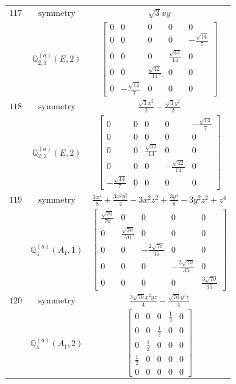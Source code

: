 \documentclass[fleqn,8pt,landscape]{jsarticle}
\begin{document}
\begin{longtable}{ccc}
$ 117 $ & $ \text{symmetry} $ & $ \sqrt{3} x y $ \\
$  $ & $ \mathbb{Q}_{2,1}^{(a)}(E,2) $ & $ \begin{bmatrix} 0 & 0 & 0 & 0 & 0 \\ 0 & 0 & 0 & 0 & - \frac{\sqrt{14}}{7} \\ 0 & 0 & 0 & \frac{\sqrt{42}}{14} & 0 \\ 0 & 0 & \frac{\sqrt{42}}{14} & 0 & 0 \\ 0 & - \frac{\sqrt{14}}{7} & 0 & 0 & 0 \end{bmatrix} $ \\ \hline
$ 118 $ & $ \text{symmetry} $ & $ \frac{\sqrt{3} x^{2}}{2} - \frac{\sqrt{3} y^{2}}{2} $ \\
$  $ & $ \mathbb{Q}_{2,2}^{(a)}(E,2) $ & $ \begin{bmatrix} 0 & 0 & 0 & 0 & - \frac{\sqrt{14}}{7} \\ 0 & 0 & 0 & 0 & 0 \\ 0 & 0 & \frac{\sqrt{42}}{14} & 0 & 0 \\ 0 & 0 & 0 & - \frac{\sqrt{42}}{14} & 0 \\ - \frac{\sqrt{14}}{7} & 0 & 0 & 0 & 0 \end{bmatrix} $ \\ \hline
$ 119 $ & $ \text{symmetry} $ & $ \frac{3 x^{4}}{8} + \frac{3 x^{2} y^{2}}{4} - 3 x^{2} z^{2} + \frac{3 y^{4}}{8} - 3 y^{2} z^{2} + z^{4} $ \\
$  $ & $ \mathbb{Q}_{4}^{(a)}(A_{1},1) $ & $ \begin{bmatrix} \frac{\sqrt{70}}{70} & 0 & 0 & 0 & 0 \\ 0 & \frac{\sqrt{70}}{70} & 0 & 0 & 0 \\ 0 & 0 & - \frac{2 \sqrt{70}}{35} & 0 & 0 \\ 0 & 0 & 0 & - \frac{2 \sqrt{70}}{35} & 0 \\ 0 & 0 & 0 & 0 & \frac{3 \sqrt{70}}{35} \end{bmatrix} $ \\ \hline
$ 120 $ & $ \text{symmetry} $ & $ \frac{3 \sqrt{70} x^{2} y z}{4} - \frac{\sqrt{70} y^{3} z}{4} $ \\
$  $ & $ \mathbb{Q}_{4}^{(a)}(A_{1},2) $ & $ \begin{bmatrix} 0 & 0 & 0 & \frac{1}{2} & 0 \\ 0 & 0 & \frac{1}{2} & 0 & 0 \\ 0 & \frac{1}{2} & 0 & 0 & 0 \\ \frac{1}{2} & 0 & 0 & 0 & 0 \\ 0 & 0 & 0 & 0 & 0 \end{bmatrix} $ \\ \hline

\end{longtable}
\end{document}
